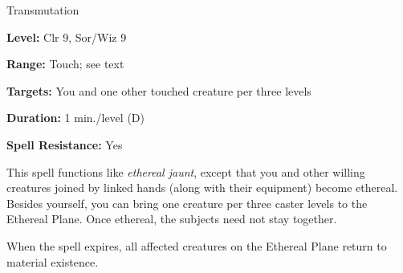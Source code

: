 
Transmutation

\textbf{Level:} Clr 9, Sor/Wiz 9

\textbf{Range:} Touch; see text

\textbf{Targets:} You and one other touched creature per three levels

\textbf{Duration:} 1 min./level (D)

\textbf{Spell Resistance:} Yes

This spell functions like \textit{ethereal jaunt}, except that you and other willing 
creatures joined by linked hands (along with their equipment) become ethereal. 
Besides yourself, you can bring one creature per three caster levels to the Ethereal 
Plane. Once ethereal, the subjects need not stay together.

When the spell expires, all affected creatures on the Ethereal Plane return to 
material existence.

